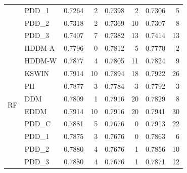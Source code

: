 \begin{table}[h]
{\begin{tabular}{llcrcrcr}
         & PDD\_1 & 0.7264 & 2 & 0.7398 & 2 & 0.7306 & 5 \\
         & PDD\_2 & 0.7318 & 2 & 0.7369 & 10 & 0.7307 & 8 \\
         & PDD\_3 & 0.7407 & 7 & 0.7382 & 13 & 0.7414 & 13 \\ \midrule
        \multirow{10}{*}{RF} & HDDM-A & 0.7796 & 0 & 0.7812 & 5 & 0.7770 & 2 \\
         & HDDM-W & 0.7877 & 4 & 0.7805 & 11 & 0.7824 & 9 \\
         & KSWIN & 0.7914 & 10 & 0.7894 & 18 & 0.7922 & 26 \\
         & PH & 0.7877 & 3 & 0.7784 & 3 & 0.7792 & 3 \\
         & DDM & 0.7809 & 1 & 0.7916 & 20 & 0.7829 & 8 \\
         & EDDM & 0.7914 & 10 & 0.7916 & 20 & 0.7941 & 30 \\
         & PDD\_C & 0.7881 & 5 & 0.7676 & 0 & 0.7913 & 22 \\
         & PDD\_1 & 0.7875 & 3 & 0.7676 & 0 & 0.7863 & 6 \\
         & PDD\_2 & 0.7880 & 4 & 0.7676 & 1 & 0.7856 & 10 \\
         & PDD\_3 & 0.7880 & 4 & 0.7676 & 1 & 0.7871 & 12 \\\bottomrule
    \end{tabular}}
\end{table}
